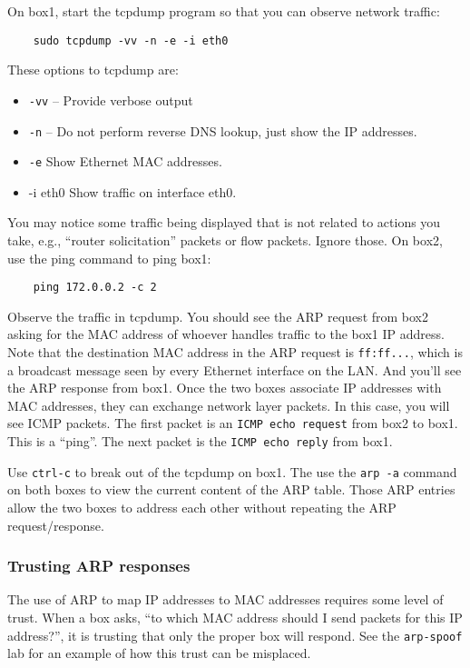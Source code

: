 On box1, start the tcpdump program so that you can observe network traffic:
\begin{verbatim}
    sudo tcpdump -vv -n -e -i eth0
\end{verbatim}
\noindent These options to tcpdump are: 
\begin{itemize}
\item {\tt -vv} -- Provide verbose output
\item {\tt -n} -- Do not perform reverse
DNS lookup, just show the IP addresses.
\item {\tt -e} Show Ethernet MAC addresses.
\item {-i eth0} Show traffic on 
interface eth0.  
\end{itemize}
You may notice some traffic being displayed that is not related to actions you take,
e.g., ``router solicitation'' packets or flow packets.  Ignore those.
On box2, use the ping command to ping box1:
\begin{verbatim}
    ping 172.0.0.2 -c 2
\end{verbatim}

Observe the traffic in tcpdump.  You should see the ARP request from box2 asking for the MAC address of whoever 
handles traffic to the box1 IP address.  Note that the destination MAC address in the ARP request is {\tt ff:ff...},
which is a broadcast message seen by every Ethernet interface on the LAN.  And you'll see the ARP 
response from box1.  Once the two boxes associate IP
addresses with MAC addresses, they can exchange network layer packets.  In this case, you will see ICMP packets.
The first packet is an {\tt ICMP echo request} from box2 to box1.  This is a ``ping''.  The next packet is the
{\tt ICMP echo reply} from box1.  

Use {\tt ctrl-c} to break out of the tcpdump on box1.  The use the {\tt arp -a} command on both boxes to view
the current content of the ARP table.  Those ARP entries allow the two boxes to address each other without repeating the 
ARP request/response.

\subsubsection{Trusting ARP responses}
The use of ARP to map IP addresses to MAC addresses requires some level of trust.  When a box asks, ``to which MAC address
should I send packets for this IP address?'', it is trusting that only the proper box will respond.  See the
{\tt arp-spoof} lab for an example of how this trust can be misplaced.


